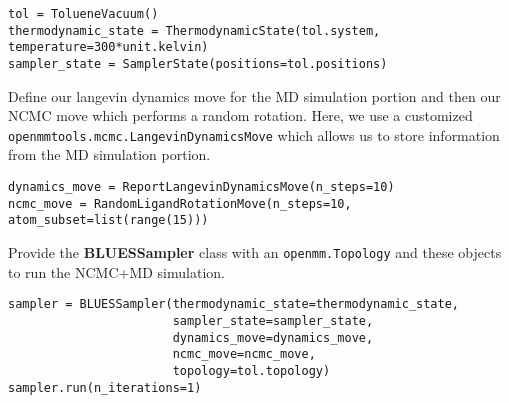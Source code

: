 \begin{verbatim}
tol = TolueneVacuum()
thermodynamic_state = ThermodynamicState(tol.system, temperature=300*unit.kelvin)
sampler_state = SamplerState(positions=tol.positions)
\end{verbatim}

Define our langevin dynamics move for the MD simulation portion and then
our NCMC move which performs a random rotation. Here, we use a
customized \texttt{openmmtools.mcmc.LangevinDynamicsMove} which allows
us to store information from the MD simulation portion.

\begin{verbatim}
dynamics_move = ReportLangevinDynamicsMove(n_steps=10)
ncmc_move = RandomLigandRotationMove(n_steps=10, atom_subset=list(range(15)))
\end{verbatim}

Provide the \textbf{BLUESSampler} class with an \texttt{openmm.Topology}
and these objects to run the NCMC+MD simulation.

\begin{verbatim}
sampler = BLUESSampler(thermodynamic_state=thermodynamic_state,
                       sampler_state=sampler_state,
                       dynamics_move=dynamics_move,
                       ncmc_move=ncmc_move,
                       topology=tol.topology)
sampler.run(n_iterations=1)
\end{verbatim}